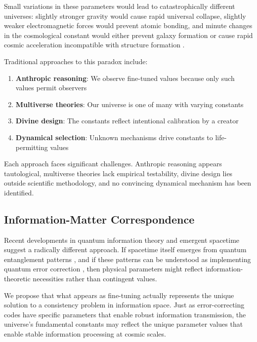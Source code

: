 \documentclass[12pt,a4paper]{article}
\begin{document}
Small variations in these parameters would lead to catastrophically different universes: slightly stronger gravity would cause rapid universal collapse, slightly weaker electromagnetic forces would prevent atomic bonding, and minute changes in the cosmological constant would either prevent galaxy formation or cause rapid cosmic acceleration incompatible with structure formation \cite{Weinberg1987}.

Traditional approaches to this paradox include:
\begin{enumerate}
\item \textbf{Anthropic reasoning}: We observe fine-tuned values because only such values permit observers \cite{Carter1974}
\item \textbf{Multiverse theories}: Our universe is one of many with varying constants \cite{Susskind2003}
\item \textbf{Divine design}: The constants reflect intentional calibration by a creator
\item \textbf{Dynamical selection}: Unknown mechanisms drive constants to life-permitting values \cite{Smolin1997}
\end{enumerate}

Each approach faces significant challenges. Anthropic reasoning appears tautological, multiverse theories lack empirical testability, divine design lies outside scientific methodology, and no convincing dynamical mechanism has been identified.

\subsection{Information-Matter Correspondence}

Recent developments in quantum information theory and emergent spacetime suggest a radically different approach. If spacetime itself emerges from quantum entanglement patterns \cite{VanRaamsdonk2010, Swingle2012}, and if these patterns can be understood as implementing quantum error correction \cite{Almheiri2015}, then physical parameters might reflect information-theoretic necessities rather than contingent values.

We propose that what appears as fine-tuning actually represents the unique solution to a consistency problem in information space. Just as error-correcting codes have specific parameters that enable robust information transmission, the universe's fundamental constants may reflect the unique parameter values that enable stable information processing at cosmic scales.
\end{document}
